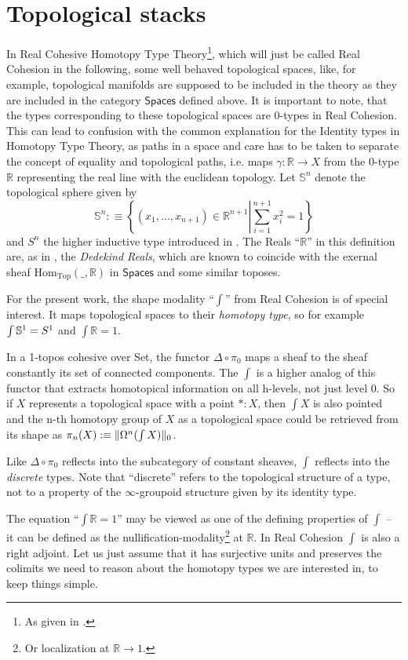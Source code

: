 \documentclass[9pt,twosided]{amsart}
\newcommand{\shape}{\int}
\newcommand{\bR}{\mathbb R}
\newcommand{\bS}{\mathbb S}
\newcommand{\Spaces}{\ensuremath{\mathsf{Spaces}}}
\begin{document}
\section{Topological stacks}
\label{sec:topological_stacks}
In Real Cohesive Homotopy Type Theory\footnote{As given in \cite{ShulmanRealCohesion}.},
which will just be called Real Cohesion in the following, 
some well behaved topological spaces, like, for example, topological manifolds
are supposed to be included in the theory as they are included in the category $\Spaces$ defined above.
It is important to note, that the types corresponding to these topological spaces
are 0-types in Real Cohesion.
This can lead to confusion with the common explanation for the Identity types in Homotopy Type Theory,
as paths in a space and care has to be taken to separate the concept of equality
and topological paths, i.e. maps $\gamma:\bR\to X$ from the 0-type $\bR$ representing the real line with the euclidean topology.
Let $\bS^{n}$ denote the topological sphere given by
\[ \bS^{n}:\equiv\left\{ (x_1,\dots,x_{n+1})\in\bR^{n+1}\left\vert \sum_{i=1}^{n+1}x_i^2=1\right.\right\}\]
and $S^n$ the higher inductive type introduced in \cite{UFP}.
The Reals ``$\bR$'' in this definition are, as in \cite{ShulmanRealCohesion}, the \emph{Dedekind Reals},
which are known to coincide with the exernal sheaf $\mathrm{Hom}_{\mathrm{Top}}(\_,\bR)$ in $\Spaces$ and some similar toposes.

For the present work, the shape modality ``$\shape$'' from Real Cohesion is of special interest.
It maps topological spaces to their \emph{homotopy type}, so for example $\shape \sphere{1} =S^1$ 
and $\shape \bR =1$.


In a 1-topos cohesive over Set, the functor $\Delta\circ\pi_0$ maps a sheaf to the sheaf constantly its set of connected components.
The $\shape$ is a higher analog of this functor that extracts homotopical information on all h-levels, not just level 0.
So if $X$ represents a topological space with a point $\ast: X$, 
then $\shape X$ is also pointed and the n-th homotopy group of $X$ as a topological space 
could be retrieved from its shape 
as $\pi_n(X):\equiv\trunc{0}{\Omega^n(\shape X)}$.

Like $\Delta\circ\pi_0$ reflects into the subcategory of constant sheaves, $\shape$ reflects into the \emph{discrete} types.
Note that ``discrete'' refers to the topological structure of a type, 
not to a property of the $\infty$-groupoid structure given by its identity type.

The equation ``$\shape \bR=1$'' may be viewed as one of the defining properties of $\shape$
-- it can be defined as the nullification-modality\footnote{Or localization at $\bR\to 1$.} at $\bR$.
In Real Cohesion $\shape$ is also a right adjoint.
Let us just assume that it has surjective units and preserves the colimits we need to reason about the homotopy types we are interested in, to keep things simple.
\end{document}

